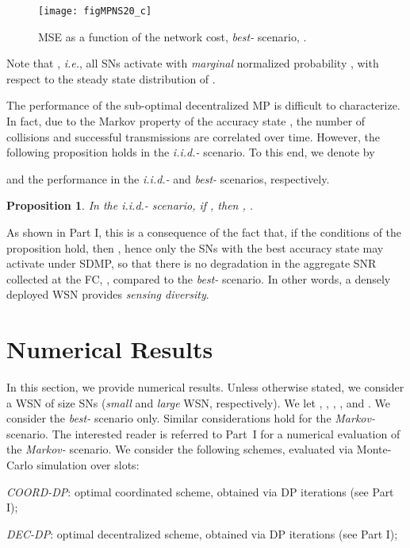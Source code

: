 \documentclass[10pt,twocolumn,twoside]{IEEEtran}
\newtheorem{propos}{Proposition}
\theoremstyle{plain}
\begin{document}
\begin{figure}[t]
\centering
\texttt{[image: figMPNS20\_c]}
\vspace{-3mm}
\caption{MSE as a function of the network cost, \emph{best-} scenario, .}\vspace{-5mm}
\label{NS20}
\end{figure}


\noindent Note that
,
\emph{i.e.}, all SNs activate with \emph{marginal} normalized probability ,
with respect to the steady state distribution of .

The performance of the sub-optimal decentralized MP is difficult to characterize. In fact, due to the Markov property of the accuracy state ,
the number of collisions and successful transmissions are correlated over time.
However, the following proposition holds in the \emph{i.i.d.-} scenario.
To this end, we denote by

and 
the performance in the
\emph{i.i.d.-}  and \emph{best-} scenarios, respectively.
\begin{propos}
In the \emph{i.i.d.-} scenario, if
, then 
, .
\end{propos}
As shown in Part I, this is a consequence of the fact that, if the conditions of the proposition hold, 
then ,
hence only the SNs with the best accuracy state may activate under SDMP, so that there is no degradation in the aggregate SNR collected at the FC, ,
compared to the \emph{best-} scenario. In other words, a densely deployed WSN provides \emph{sensing diversity}.


\section{Numerical Results}\label{numres}
\noindent In this section, we provide numerical results.
Unless otherwise stated, we consider a WSN of size  SNs (\emph{small} and \emph{large} WSN, respectively).
We let , , , , and .
We consider the \emph{best-} scenario only. Similar considerations hold for the \emph{Markov-} scenario.
The interested reader is referred to Part~I for a numerical evaluation of the \emph{Markov-} scenario.
We consider the following schemes, evaluated via Monte-Carlo simulation over  slots:

\noindent \emph{COORD-DP}: optimal coordinated scheme, obtained via  DP iterations (see Part I);
 
 \noindent  \emph{DEC-DP}:  optimal decentralized scheme, obtained via  DP iterations (see Part I);
\end{document}

